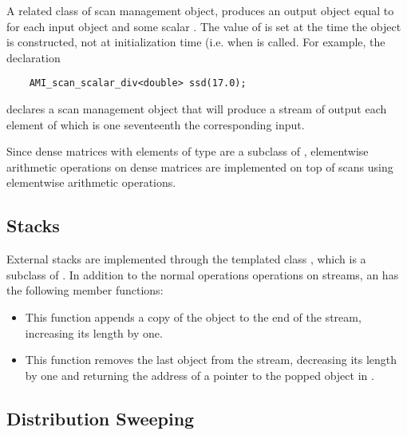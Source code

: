 A related class of scan management object,
 produces an output object equal to
 for each input object  and some scalar .
The value of  is set at the time the object is constructed,
not at initialization time (i.e. when  is called.
For example, the declaration
\begin{verbatim}
    AMI_scan_scalar_div<double> ssd(17.0);
\end{verbatim}
declares a scan management object that will produce a stream of output
each element of which is one seventeenth the corresponding input.

Since dense matrices with elements of type  are a subclass of
, elementwise arithmetic operations on dense
matrices are implemented on top of scans using elementwise arithmetic
operations.



\subsection{Stacks}


External stacks are implemented through the templated class
, 
which is a subclass of . In
addition to the normal operations operations on streams, an
 has the following member functions:
\begin{itemize}
    \item {} This function
    appends a copy of the object  to the end of
    the stream, increasing its length by one.

    \item {} This function
    removes the last object from the stream, decreasing its
    length by one and returning the address of a pointer to
    the popped object in .
\end{itemize}

\subsection{Distribution Sweeping}

\tobewritten

